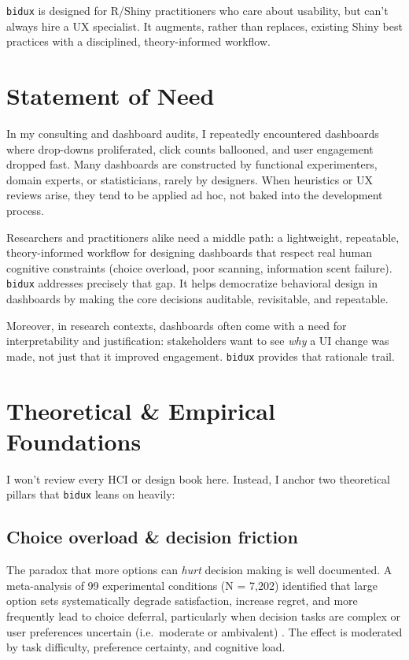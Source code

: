 \documentclass[
  authoryear,
  preprint]{elsarticle}
\begin{document}
\texttt{bidux} is designed for R/Shiny practitioners who care about
usability, but can't always hire a UX specialist. It augments, rather
than replaces, existing Shiny best practices with a disciplined,
theory-informed workflow.

\section{Statement of Need}\label{statement-of-need}

In my consulting and dashboard audits, I repeatedly encountered
dashboards where drop-downs proliferated, click counts ballooned, and
user engagement dropped fast. Many dashboards are constructed by
functional experimenters, domain experts, or statisticians, rarely by
designers. When heuristics or UX reviews arise, they tend to be applied
ad hoc, not baked into the development process.

Researchers and practitioners alike need a middle path: a lightweight,
repeatable, theory-informed workflow for designing dashboards that
respect real human cognitive constraints (choice overload, poor
scanning, information scent failure). \texttt{bidux} addresses precisely
that gap. It helps democratize behavioral design in dashboards by making
the core decisions auditable, revisitable, and repeatable.

Moreover, in research contexts, dashboards often come with a need for
interpretability and justification: stakeholders want to see \emph{why}
a UI change was made, not just that it improved engagement.
\texttt{bidux} provides that rationale trail.

\section{Theoretical \& Empirical
Foundations}\label{theoretical-empirical-foundations}

I won't review every HCI or design book here. Instead, I anchor two
theoretical pillars that \texttt{bidux} leans on heavily:

\subsection{Choice overload \& decision
friction}\label{choice-overload-decision-friction}

The paradox that more options can \emph{hurt} decision making is well
documented. A meta-analysis of 99 experimental conditions (N = 7,202)
identified that large option sets systematically degrade satisfaction,
increase regret, and more frequently lead to choice deferral,
particularly when decision tasks are complex or user preferences
uncertain (i.e.~moderate or ambivalent) \citep{chernev2015}. The effect
is moderated by task difficulty, preference certainty, and cognitive
load.
\end{document}
